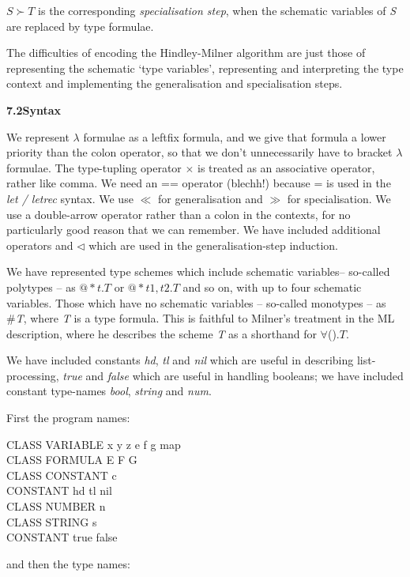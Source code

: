 \documentclass[11pt]{book}
\newcommand{\tab}{\hspace{5mm}}
\begin{document}
$S\succ T$ is the corresponding \textit{specialisation step}, when the schematic variables of \textit{S} are replaced by type formulae.


The difficulties of encoding the Hindley-Milner algorithm are just those of representing the schematic `type variables', representing and interpreting the type context and implementing the generalisation and specialisation steps.


\textbf{7.2\tab Syntax}


We represent \ensuremath{\lambda} formulae as a leftfix formula, and we give that formula a lower priority than the colon operator, so that we don't unnecessarily have to bracket \ensuremath{\lambda} formulae. The type-tupling operator \ensuremath{\times} is treated as an associative operator, rather like comma. We need an == operator (blechh!) because = is used in the \textit{let / letrec} syntax. We use $\ll$ for generalisation and $\gg$ for specialisation. We use a double-arrow operator rather than a colon in the contexts, for no particularly good reason that we can remember. We have included additional operators {\textbullet} and $\triangleleft$ which are used in the generalisation-step induction.


We have represented type schemes which include schematic variables-- so-called polytypes -- as $@*t.T$ or $@*t1,t2.T$ and so on, with up to four schematic variables. Those which have no schematic variables -- so-called monotypes -- as \#\textit{T}, where \textit{T} is a type formula. This is faithful to Milner's treatment in the ML description, where he describes the scheme \textit{T} as a shorthand for \ensuremath{\forall}().\textit{\ensuremath{T}}.


We have included constants \textit{hd}, \textit{tl} and \textit{nil} which are useful in describing list-processing, \textit{true} and \textit{false} which are useful in handling booleans; we have included constant type-names \textit{bool}, \textit{string} and \textit{num}.


First the program names:

CLASS VARIABLE x y z e f g map\\
CLASS FORMULA E F G\\
CLASS CONSTANT c\\
CONSTANT hd tl nil\\
CLASS NUMBER n\\
CLASS STRING s\\
CONSTANT true false


and then the type names:
\end{document}
